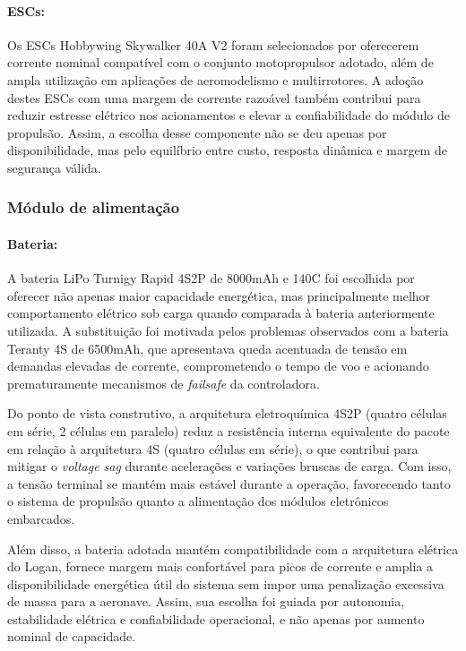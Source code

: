 \paragraph{ESCs:}
Os ESCs Hobbywing Skywalker 40A V2 foram selecionados por oferecerem corrente nominal compatível com o conjunto motopropulsor adotado, além de ampla utilização em aplicações de aeromodelismo e multirrotores. A adoção destes ESCs com uma margem de corrente razoável também contribui para reduzir estresse elétrico nos acionamentos e elevar a confiabilidade do módulo de propulsão. Assim, a escolha desse componente não se deu apenas por disponibilidade, mas pelo equilíbrio entre custo, resposta dinâmica e margem de segurança válida.

\subsubsection{Módulo de alimentação}

\paragraph{Bateria:}
A bateria LiPo Turnigy Rapid 4S2P de 8000mAh e 140C foi escolhida por oferecer não apenas maior capacidade energética, mas principalmente melhor comportamento elétrico sob carga quando comparada à bateria anteriormente utilizada. A substituição foi motivada pelos problemas observados com a bateria Teranty 4S de 6500mAh, que apresentava queda acentuada de tensão em demandas elevadas de corrente, comprometendo o tempo de voo e acionando prematuramente mecanismos de \textit{failsafe} da controladora.

Do ponto de vista construtivo, a arquitetura eletroquímica 4S2P (quatro células em série, 2 células em paralelo) reduz a resistência interna equivalente do pacote em relação à arquitetura 4S (quatro células em série), o que contribui para mitigar o \textit{voltage sag} durante acelerações e variações bruscas de carga. Com isso, a tensão terminal se mantém mais estável durante a operação, favorecendo tanto o sistema de propulsão quanto a alimentação dos módulos eletrônicos embarcados.

Além disso, a bateria adotada mantém compatibilidade com a arquitetura elétrica do Logan, fornece margem mais confortável para picos de corrente e amplia a disponibilidade energética útil do sistema sem impor uma penalização excessiva de massa para a aeronave. Assim, sua escolha foi guiada por autonomia, estabilidade elétrica e confiabilidade operacional, e não apenas por aumento nominal de capacidade. 

